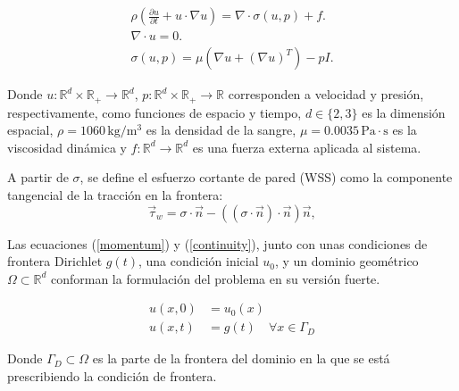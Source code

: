 \documentclass[12pt, letterpaper]{article}
\begin{document}
\begin{center}
  \begin{subequations}
    \begin{align}
      \label{momentum}
      \rho\left(\frac{\partial u}{\partial t}+ u \cdot \nabla u\right) = \nabla \cdot \sigma(u,p) + f. \\
      \label{continuity}
      \nabla \cdot u = 0. \\
      \sigma(u,p) = \mu(\nabla u + (\nabla u)^T) - pI.
    \end{align}
  \end{subequations}
\end{center}

Donde $u: \mathbb{R}^d \times \mathbb{R}_+ \rightarrow \mathbb{R}^d$, $p: \mathbb{R}^d \times \mathbb{R}_+ \rightarrow \mathbb{R}$ corresponden a velocidad y presión, respectivamente, como funciones de espacio y tiempo, $d \in \{2,3\}$ es la dimensión espacial, $\rho = 1060 \, \text{kg}/\text{m}^3$ es la densidad de la sangre, $\mu = 0.0035\, \text{Pa} \cdot \text{s}$ es la viscosidad dinámica \cite{ku_blood_1997} y $f: \mathbb{R}^d \rightarrow \mathbb{R}^d$ es una fuerza externa aplicada al sistema. 

A partir de $\sigma$, se define el esfuerzo cortante de pared (WSS) como la componente tangencial de la tracción en la frontera:
\begin{equation}
    \label{eq:wss_definition}
    \vec{\tau}_w = \sigma \cdot \vec{n} - ((\sigma \cdot \vec{n}) \cdot \vec{n})\vec{n},
\end{equation}



Las ecuaciones (\ref{momentum}) y (\ref{continuity}), junto con unas condiciones de frontera Dirichlet $g(t)$, una condición inicial $u_0$, y un dominio geométrico $\Omega \subset \mathbb{R}^d$ conforman la formulación del problema en su versión fuerte.

\begin{center}
  \begin{subequations}
    \begin{align}
      u(x,0) &= u_0(x) \\
      u(x,t) &= g(t) \quad \forall x \in \Gamma_D
    \end{align}
  \end{subequations}
\end{center}

Donde $\Gamma_D \subset \Omega$ es la parte de la frontera del dominio en la que se está prescribiendo la condición de frontera.
\end{document}
